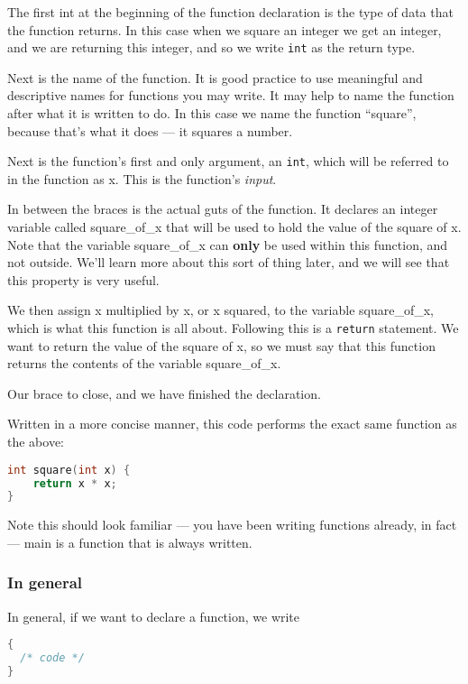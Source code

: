 The first int at the beginning of the function declaration is the type of data
that the function returns. In this case when we square an integer we get an
integer, and we are returning this integer, and so we write \texttt{int} as the
return type.

Next is the name of the function. It is good practice to use meaningful and
descriptive names for functions you may write. It may help to name the function
after what it is written to do. In this case we name the function ``square'',
because that's what it does --- it squares a number.

Next is the function's first and only argument, an \texttt{int}, which will be
referred to in the function as x. This is the function's \emph{input}. 

In between the braces is the actual guts of the function. It declares an
integer variable called square\_of\_x that will be used to hold the value of
the square of x. Note that the variable square\_of\_x can \textbf{only} be used
within this function, and not outside. We'll learn more about this sort of
thing later, and we will see that this property is very useful. 

We then assign x multiplied by x, or x squared, to the variable square\_of\_x,
which is what this function is all about. Following this is a \texttt{return}
statement. We want to return the value of the square of x, so we must say that
this function returns the contents of the variable square\_of\_x.

Our brace to close, and we have finished the declaration.

Written in a more concise manner, this code performs the exact same function as
the above:

\lstset{basicstyle=\scriptsize, numbers=left, captionpos=b, tabsize=4}
\begin{lstlisting}[caption=Section \thesection listing \arabic{funccnt},language={C},
breaklines=true,xleftmargin=15pt, label=lst:section\thesection listing\arabic{funccnt}]
int square(int x) {
	return x * x;
}
\end{lstlisting}

Note this should look familiar --- you have been writing functions already, in
fact --- main is a function that is always written.

\subsubsection{In general}
In general, if we want to declare a function, we write
\lstset{basicstyle=\scriptsize, numbers=left, captionpos=b, tabsize=4}
\begin{lstlisting}[caption=Section \thesection listing \arabic{funccnt},language={C},
breaklines=true,xleftmargin=15pt, label=lst:section\thesection listing\arabic{funccnt}]
{
  /* code */
} 
\end{lstlisting}


